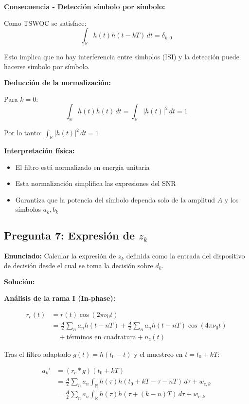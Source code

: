 \documentclass[11pt,a4paper]{article}
\begin{document}
\textbf{Consecuencia - Detecci\'on s\'imbolo por s\'imbolo:}

Como TSWOC se satisface:
\[
\int_{\mathbb{R}} h(t) h(t - kT)\, dt = \delta_{k,0}
\]

Esto implica que no hay interferencia entre s\'imbolos (ISI) y la detecci\'on puede hacerse s\'imbolo por s\'imbolo.

\textbf{Deducci\'on de la normalizaci\'on:}

Para $k = 0$:
\[
\int_{\mathbb{R}} h(t) h(t)\, dt = \int_{\mathbb{R}} |h(t)|^2\, dt = 1
\]

Por lo tanto: $\boxed{\int_{\mathbb{R}} |h(t)|^2\, dt = 1}$

\textbf{Interpretaci\'on f\'isica:}
\begin{itemize}
    \item El filtro est\'a normalizado en energ\'ia unitaria
    \item Esta normalizaci\'on simplifica las expresiones del SNR
    \item Garantiza que la potencia del s\'imbolo dependa solo de la amplitud $A$ y los s\'imbolos $a_k, b_k$
\end{itemize}



\subsection*{Pregunta 7: Expresi\'on de $z_k$}

\textbf{Enunciado:} Calcular la expresi\'on de $z_k$ definida como la entrada del dispositivo de decisi\'on desde el cual se toma la decisi\'on sobre $d_k$.

\vspace{0.3cm}
\textbf{Soluci\'on:}

\textbf{An\'alisis de la rama I (In-phase):}

\begin{align*}
r_c(t) &= r(t) \cos(2\pi\nu_0 t) \\
&= \frac{A}{2}\sum_n a_n h(t-nT) + \frac{A}{2}\sum_n a_n h(t-nT)\cos(4\pi\nu_0 t) \\
&\quad + \text{t\'erminos en cuadratura} + n_c(t)
\end{align*}

Tras el filtro adaptado $g(t) = h(t_0 - t)$ y el muestreo en $t = t_0 + kT$:

\begin{align*}
a_k' &= (r_c * g)(t_0 + kT) \\
&= \frac{A}{2}\sum_n a_n \int_{\mathbb{R}} h(\tau) h(t_0 + kT - \tau - nT)\, d\tau + w_{c,k} \\
&= \frac{A}{2}\sum_n a_n \int_{\mathbb{R}} h(\tau) h(\tau + (k-n)T)\, d\tau + w_{c,k}
\end{align*}
\end{document}
